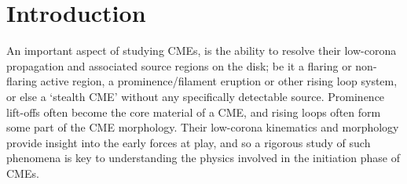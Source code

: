 \documentclass[preprint2]{aastex}
\begin{document}

\section{Introduction}

An important aspect of studying CMEs, is the ability to resolve their low-corona propagation and associated source regions on the disk; be it a flaring or non-flaring active region, a prominence/filament eruption or other rising loop system, or else a `stealth CME' without any specifically detectable source. Prominence lift-offs often become the core material of a CME, and rising loops often form some part of the CME morphology. Their low-corona kinematics and morphology provide insight into the early forces at play, and so a rigorous study of such phenomena is key to understanding the physics involved in the initiation phase of CMEs.
\end{document}
